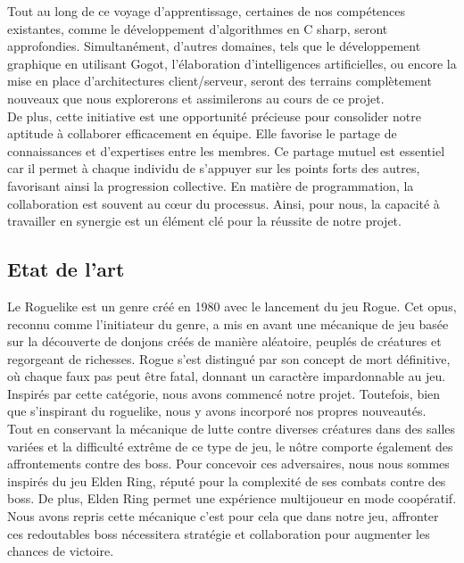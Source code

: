 \documentclass{article}
\begin{document}
Tout au long de ce voyage d'apprentissage, certaines de nos compétences existantes, comme le développement d'algorithmes en C sharp, seront approfondies. Simultanément, d'autres domaines, tels que le développement graphique en utilisant Gogot, l'élaboration d'intelligences artificielles, ou encore la mise en place d'architectures client/serveur, seront des terrains complètement nouveaux que nous explorerons et assimilerons au cours de ce projet.\\

De plus, cette initiative est une opportunité précieuse pour consolider notre aptitude à collaborer efficacement en équipe. Elle favorise le partage de connaissances et d'expertises entre les membres. Ce partage mutuel est essentiel car il permet à chaque individu de s'appuyer sur les points forts des autres, favorisant ainsi la progression collective. En matière de programmation, la collaboration est souvent au cœur du processus. Ainsi, pour nous, la capacité à travailler en synergie est un élément clé pour la réussite de notre projet.\\

\subsection{Etat de l'art}
Le Roguelike est un genre créé en 1980 avec le lancement du jeu Rogue. Cet opus, reconnu comme l'initiateur du genre, a mis en avant une mécanique de jeu basée sur la découverte de donjons créés de manière aléatoire, peuplés de créatures et regorgeant de richesses. Rogue s'est distingué par son concept de mort définitive, où chaque faux pas peut être fatal, donnant un caractère impardonnable au jeu. Inspirés par cette catégorie, nous avons commencé notre projet. Toutefois, bien que s'inspirant du roguelike, nous y avons incorporé nos propres nouveautés.\\

Tout en conservant la mécanique de lutte contre diverses créatures dans des salles variées et la difficulté extrême de ce type de jeu, le nôtre comporte également des affrontements contre des boss. Pour concevoir ces adversaires, nous nous sommes inspirés du jeu Elden Ring, réputé pour la complexité de ses combats contre des boss. De plus, Elden Ring permet une expérience multijoueur en mode coopératif. Nous avons repris cette mécanique c’est pour cela que dans notre jeu, affronter ces redoutables boss nécessitera stratégie et collaboration pour augmenter les chances de victoire.\\
\end{document}
